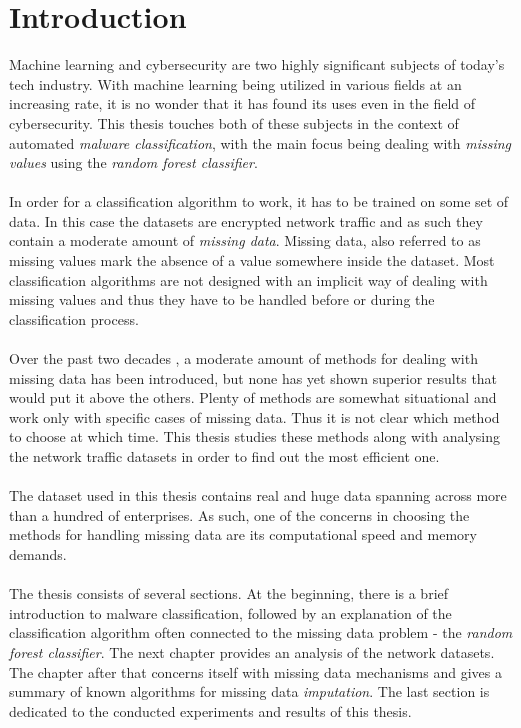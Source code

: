 \documentclass[11pt]{article}
\begin{document}
  \section*{Introduction}
    Machine learning and cybersecurity are two highly significant subjects of today's tech industry. With machine learning being utilized in various fields at an increasing rate, it is no wonder that it has found its uses even in the field of cybersecurity. This thesis touches both of these subjects in the context of automated {\it malware classification}, with the main focus being dealing with {\it missing values} using the {\it random forest classifier}.
    \\~\\
    In order for a classification algorithm to work, it has to be trained on some set of data. In this case the datasets are encrypted network traffic and as such they contain a moderate amount of {\it missing data}. Missing data, also referred to as missing values mark the absence of a value somewhere inside the dataset. Most classification algorithms are not designed with an implicit way of dealing with missing values and thus they have to be handled before or during the classification process.
    \\~\\
    Over the past two decades \cite{otfi}\cite{lwd}\cite{mia}, a moderate amount of methods for dealing with missing data has been introduced, but none has yet shown superior results that would put it above the others. Plenty of methods are somewhat situational and work only with specific cases of missing data. Thus it is not clear which method to choose at which time. This thesis studies these methods along with analysing the network traffic datasets in order to find out the most efficient one.
    \\~\\
    The dataset used in this thesis contains real and huge data spanning across more than a hundred of enterprises. As such, one of the concerns in choosing the methods for handling missing data are its computational speed and memory demands.
    \\~\\
    The thesis consists of several sections. At the beginning, there is a brief introduction to malware classification, followed by an explanation of the classification algorithm often connected to the missing data problem - the {\it random forest classifier}. The next chapter provides an analysis of the network datasets. The chapter after that concerns itself with missing data mechanisms and gives a summary of known algorithms for missing data {\it imputation}. The last section is dedicated to the conducted experiments and results of this thesis.
  \newpage
\end{document}
